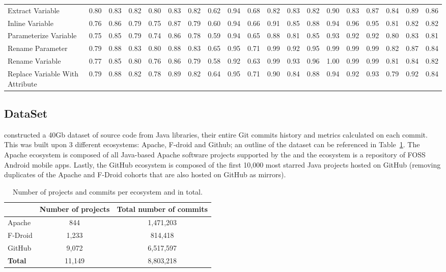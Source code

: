 \begin{table}[!ht]
{\begin{tabular}{l c c c|c c c|c c c|c c c|c c c|c c c}
Extract Variable & 0.80 & 0.83 & 0.82 & 0.80 & 0.83 & 0.82 & 0.62 & 0.94 & 0.68 & 0.82 & 0.83 & 0.82 & 0.90 & 0.83 & 0.87 & 0.84 & 0.89 & 0.86 \\
Inline Variable & 0.76 & 0.86 & 0.79 & 0.75 & 0.87 & 0.79 & 0.60 & 0.94 & 0.66 & 0.91 & 0.85 & 0.88 & 0.94 & 0.96 & 0.95 & 0.81 & 0.82 & 0.82 \\
Parameterize Variable & 0.75 & 0.85 & 0.79 & 0.74 & 0.86 & 0.78 & 0.59 & 0.94 & 0.65 & 0.88 & 0.81 & 0.85 & 0.93 & 0.92 & 0.92 & 0.80 & 0.83 & 0.81\\
Rename Parameter & 0.79 & 0.88 & 0.83 & 0.80 & 0.88 & 0.83 & 0.65 & 0.95 & 0.71 & 0.99 & 0.92 & 0.95 & 0.99 & 0.99 & 0.99 & 0.82 & 0.87 & 0.84 \\
Rename Variable & 0.77 & 0.85 & 0.80 & 0.76 & 0.86 & 0.79 & 0.58 & 0.92 & 0.63 & 0.99 & 0.93 & 0.96 & 1.00 & 0.99 & 0.99 & 0.81 & 0.84 & 0.82 \\
Replace Variable With Attribute & 0.79 & 0.88 & 0.82 & 0.78 & 0.89 & 0.82 & 0.64 & 0.95 & 0.71 & 0.90 & 0.84 & 0.88 & 0.94 & 0.92 & 0.93 & 0.79 & 0.92 & 0.84 \\
\hline
\end{tabular}
}
\end{table}



\subsection{DataSet}
\label{sec:mauricio_dataset}



\citet{mauricio_paper} constructed a 40Gb dataset of source code from Java libraries, their entire Git commits history and metrics calculated on each commit. This was built upon 3 different ecosystems: Apache, F-droid and Github; an outline of the dataset can be referenced in Table~\ref{table:mau_dataset}.
The Apache ecosystem is composed of all Java-based Apache software projects supported by the \citet{apache} and the \citet{fdroid} ecosystem is a repository of FOSS Android mobile apps. Lastly, the GitHub ecosystem is composed of the first 10,000 most starred Java projects hosted on GitHub (removing duplicates of the Apache and F-Droid cohorts that are also hosted on GitHub as mirrors).

\begin{table}[!ht]
\caption{Number of projects and commits per ecosystem and in total.}
\label{table:mau_dataset}

\begin{tabular}{l|c|c}
               & Number of projects & Total number of commits \\ \hline
Apache         & 844                & 1,471,203                 \\
F-Droid        & 1,233               & 814,418                  \\
GitHub         & 9,072               & 6,517,597                 \\ \hline
\textbf{Total} & 11,149              & 8,803,218                
\end{tabular}
\end{table}





